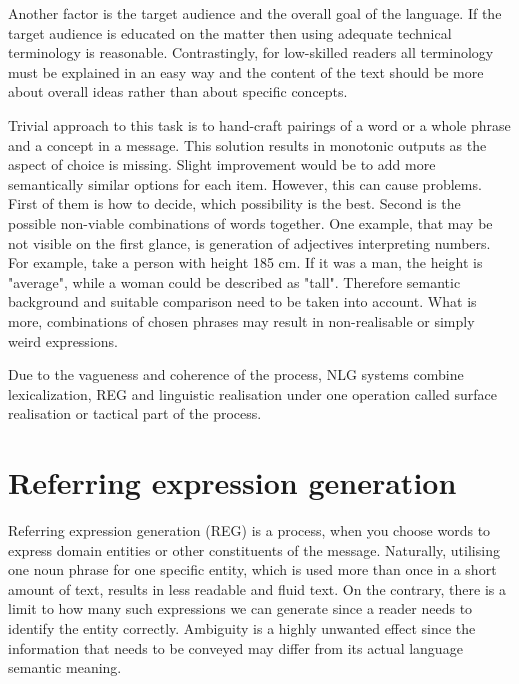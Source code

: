 Another factor is the target audience and the overall goal of the language. If the target audience is educated on the matter then using adequate technical terminology is reasonable. Contrastingly, for low-skilled readers all terminology must be explained in an easy way and the content of the text should be more about overall ideas rather than about specific concepts. 

Trivial approach to this task is to hand-craft pairings of a word or a whole phrase and a concept in a message. This solution results in monotonic outputs as the aspect of choice is missing. Slight improvement would be to add more semantically similar options for each item. However, this can cause problems. First of them is how to decide, which possibility is the best. Second is the possible non-viable combinations of words together. One example, that may be not visible on the first glance, is generation of adjectives interpreting numbers. For example, take a person with height 185 cm. If it was a man, the height is "average", while a woman could be described as "tall". Therefore semantic background and suitable comparison need to be taken into account. What is more, combinations of chosen phrases may result in non-realisable or simply weird expressions. 

Due to the vagueness and coherence of the process, NLG systems combine lexicalization, REG and linguistic realisation under one operation called surface realisation or tactical part of the process.  

\section{Referring expression generation}
Referring expression generation (REG) is a process, when you choose words to express domain entities or other constituents of the message. Naturally, utilising one noun phrase for one specific entity, which is used more than once in a short amount of text, results in less readable and fluid text. On the contrary, there is a limit to how many such expressions we can generate since a reader needs to identify the entity correctly. Ambiguity is a highly unwanted effect since the information that needs to be conveyed may differ from its actual language semantic meaning.

